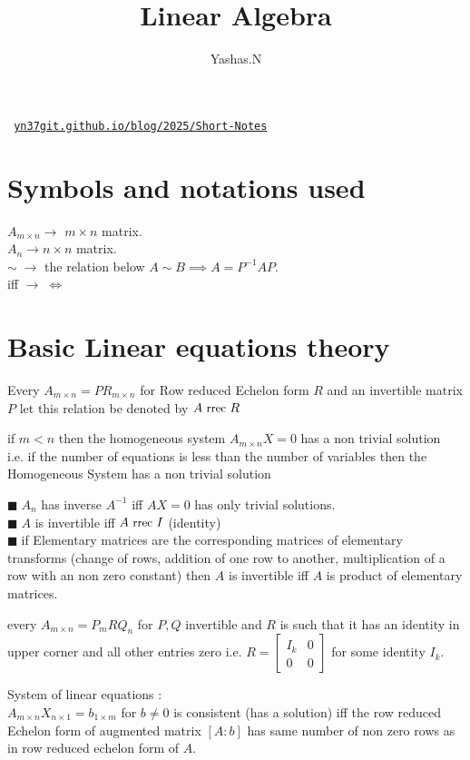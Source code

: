 \documentclass[11pt]{extarticle}
\author{Yashas.N}
\title{Linear Algebra }
\date{}
\newcommand{\ra}{\rightarrow}
\newcommand{\w}[1]{\text{#1}}
\newcommand{\snote}[1]{{\footnotesize(#1)}}
\newcommand{\tm}{\times}
\newcommand{\tbx}[2][]{
	\begin{tcolorbox}[enhanced,breakable,size=small,colback=black!2!white,title={#1},arc is angular, arc=1.5mm,drop fuzzy shadow]
		#2
	\end{tcolorbox}
}
\newcommand{\y}{$\blacksquare\;$}
\newcommand{\rref}{\w{\small{ rrec }}}
\newcommand{\yi}{\\$\blacksquare\;$}
\begin{document}
	\maketitle
	\begin{center}\texttt{
			\href{https://yn37git.github.io/blog/2025/Short-Notes/}{yn37git.github.io/blog/2025/Short-Notes}}
	\end{center} 
	
	\boldmath
\begin{multicols}{2}
	\tableofcontents
	\section*{\normalsize Symbols and notations used}
	\tbx{\centering
	$ A_{m\tm n} \ra$ $ m\tm n $ matrix. \\
	 $ A_n \ra n\tm n$ matrix.\\
	 $ \sim \;\ra $ the relation below $ A\sim B\implies A=P^{-1}AP.$\\ 
	 iff $ \ra\; \iff $  
	}
	\section{Basic Linear equations theory}
	\tbx{ Every $ A_{m\tm n}=PR_{m\tm n} $ for Row reduced Echelon form $ R $ and an invertible matrix $ P $ let this relation be denoted by $ A \w{\small{ rrec }} R$}
   \tbx{ if $ m<n $ then the homogeneous system $ A_{m\tm n}X=0 $ has a non trivial solution \\
   i.e. if the number of equations is less than the number of variables then the Homogeneous System has a non trivial solution }
   \tbx[Inverse Properties]{  
   \y $ A_n $ has inverse $ A^{-1} $ iff $ AX=0 $ has only trivial solutions.
   \yi $ A $ is invertible iff $ A\rref I $ (identity) 
   \yi if Elementary matrices are the corresponding matrices of elementary transforms \snote{change of rows, addition of one row to another, multiplication of a row with an non zero constant} then 
   $ A $ is invertible iff $ A $ is product of elementary matrices. }
   \tbx[Echelon Form]{ every $ A_{m\tm n}=P_m R Q_n $ for $ P,Q $ invertible and $ R $ is such that it has an identity in upper corner and all other entries zero i.e. $ R= \begin{bmatrix}
   		I_k & 0\\
   		0& 0
   	\end{bmatrix} $  for some identity $ I_k .$ }
	\tbx[Consistency ]{System of linear equations : \\$ A_{m\tm n}X_{n\tm 1}=b_{1\tm m}$ for $ b\neq 0 $  is consistent \snote{has a solution}  iff the row reduced Echelon form of augmented matrix $ [A:b] $ has same number of non zero rows as in row reduced echelon form of $ A.$ }

\end{multicols}
\end{document}
